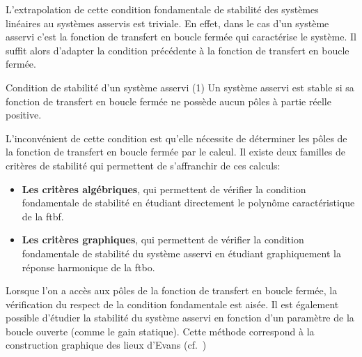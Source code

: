 L'extrapolation de cette condition fondamentale de stabilité des systèmes 
linéaires au systèmes asservis est triviale. En effet, dans le cas d'un 
système asservi c'est la fonction de transfert en boucle fermée qui 
caractérise le système. Il suffit alors d'adapter la condition précédente à la
fonction de transfert en boucle fermée.
\begin{criteria}{Condition de stabilité d'un système asservi (1)}
         Un système asservi est stable si sa fonction de transfert en 
         boucle fermée ne possède aucun pôles à partie réelle positive.
\end{criteria}
L'inconvénient de cette condition est qu'elle nécessite de déterminer les
pôles de la fonction de transfert en boucle fermée par le calcul. Il existe
deux familles de critères de stabilité qui permettent de s'affranchir de 
ces calculs:
\begin{itemize}
    \item \textbf{Les critères algébriques}, qui permettent de vérifier 
        la condition fondamentale de stabilité en étudiant directement 
        le polynôme caractéristique de la \gls{ftbf}.
    \item \textbf{Les critères graphiques}, qui permettent de vérifier 
        la condition fondamentale de stabilité du système asservi en 
        étudiant graphiquement la réponse harmonique de la \gls{ftbo}.
\end{itemize}
Lorsque l'on a accès aux pôles de la fonction de transfert en boucle fermée, la
vérification du respect de la condition fondamentale est aisée. Il est également
possible d'étudier la stabilité du système asservi en fonction d'un paramètre 
de la boucle ouverte (comme le gain statique). Cette méthode correspond à la 
construction graphique des lieux d'Evans (cf.~)
\newpage

\captionsetup{width=0.9\linewidth}
